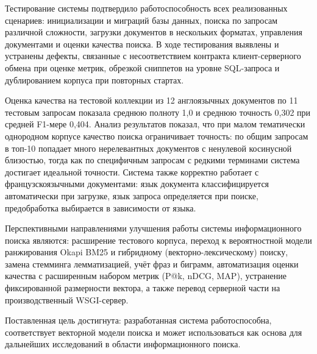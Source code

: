 Тестирование системы подтвердило работоспособность всех реализованных сценариев:
инициализации и миграций базы данных, поиска по запросам различной сложности, загрузки
документов в нескольких форматах, управления документами и оценки качества поиска.
В ходе тестирования выявлены и устранены дефекты, связанные с несоответствием контракта
клиент-серверного обмена при оценке метрик, обрезкой сниппетов на уровне SQL-запроса и
дублированием корпуса при повторных стартах.

Оценка качества на тестовой коллекции из 12 англоязычных документов по 11 тестовым
запросам показала среднюю полноту 1,0 и среднюю точность 0,302 при средней F1-мере
0,404. Анализ результатов показал, что при малом тематически однородном корпусе
качество поиска ограничивает точность: по общим запросам в топ-10 попадает много
нерелевантных документов с ненулевой косинусной близостью, тогда как по специфичным
запросам с редкими терминами система достигает идеальной точности. Система также
корректно работает с французскоязычными документами: язык документа классифицируется
автоматически при загрузке, язык запроса определяется при поиске, предобработка
выбирается в зависимости от языка.

Перспективными направлениями улучшения работы системы информационного поиска являются:
расширение тестового корпуса, переход к вероятностной модели ранжирования Okapi BM25
и гибридному (векторно-лексическому) поиску, замена стемминга лемматизацией, учёт фраз
и биграмм, автоматизация оценки качества с расширенным набором метрик (P@k, nDCG, MAP),
устранение фиксированной размерности вектора, а также перевод серверной части на
производственный WSGI-сервер.

Поставленная цель достигнута: разработанная система работоспособна, соответствует
векторной модели поиска и может использоваться как основа для дальнейших исследований
в области информационного поиска.